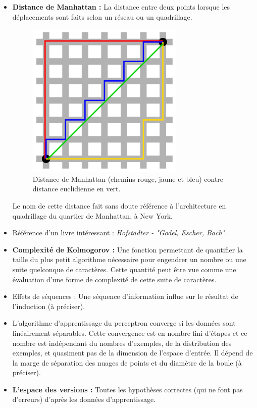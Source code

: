 \documentclass{article}
\begin{document}
\begin{itemize}
\item \textbf{Distance de Manhattan :} La distance entre deux points lorsque les déplacements sont faits selon un réseau ou un quadrillage. 

\begin{figure}[H]
    \begin{center} \includegraphics[scale=0.5]{manhattan.png} \end{center}
     \caption{Distance de Manhattan (chemins rouge, jaune et bleu) contre distance euclidienne en vert.}
\end{figure}

Le nom de cette distance fait sans doute référence à l'architecture en quadrillage du quartier de Manhattan, à New York.

\item Référence d'un livre intéressant : \textit{Hofstadter - "Godel, Escher, Bach".}
\item \textbf{Complexité de Kolmogorov :} Une fonction permettant de quantifier la taille du plus petit algorithme nécessaire pour engendrer un nombre ou une suite quelconque de caractères. Cette quantité peut être vue comme une évaluation d'une forme de complexité de cette suite de caractères.
\item Effets de séquences : Une séquence d'information influe sur le résultat de l'induction (à préciser).
\item L'algorithme d'apprentissage du perceptron converge si les données sont linéairement séparables. Cette convergence est en nombre fini d'étapes et ce nombre est indépendant du nombres d'exemples, de la distribution des exemples, et quasiment pas de la dimension de l'espace d'entrée. Il dépend de la marge de séparation des nuages de points et du diamètre de la boule (à préciser).
\item \textbf{L'espace des versions :} Toutes les hypothèses correctes (qui ne font pas d'erreurs) d'après les données d'apprentissage.
\end{itemize}
\end{document}
